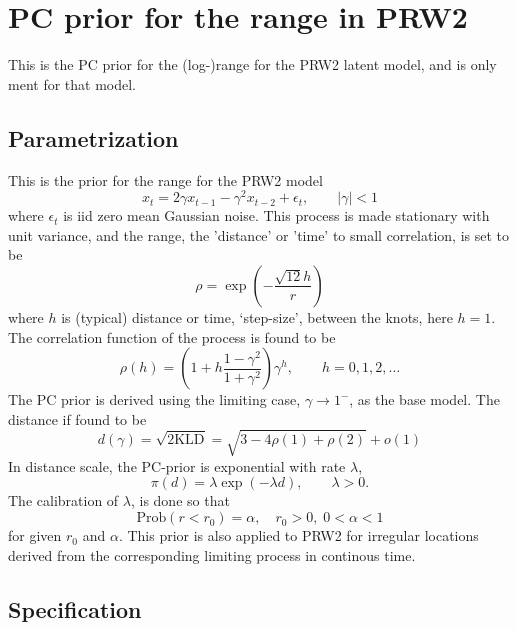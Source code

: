 \documentclass[a4paper,11pt]{article}
\begin{document}
\section*{PC prior for the range in PRW2}

This is the PC prior for the (log-)range for the PRW2 latent model,
and is only ment for that model.

\subsection*{Parametrization}

This is the prior for the range for the PRW2 model
\begin{displaymath}
    x_t = 2\gamma x_{t-1} - \gamma^{2} x_{t-2} + \epsilon_t, \qquad
    |\gamma| < 1
\end{displaymath}
where $\epsilon_t$ is iid zero mean Gaussian noise. This process is
made stationary with unit variance, and the range, the 'distance' or
'time' to small correlation, is set to be
\begin{displaymath}
    \rho = \exp\left( - \frac{\sqrt{12} h}{r} \right)
\end{displaymath}
where $h$ is (typical) distance or time, `step-size', between the
knots, here $h=1$. The correlation function of the process is found to
be
\begin{displaymath}
    \rho(h) = \left(1  + h \frac{1-\gamma^{2}}{1+\gamma^{2}}\right)\gamma^{h},
    \qquad h=0, 1, 2, \ldots
\end{displaymath}
The PC prior is derived using the limiting case,
$\gamma\rightarrow 1^{-}$, as the base model. The distance if found to
be
\begin{displaymath}
    d(\gamma) = \sqrt{2\text{KLD}} = \sqrt{3 - 4\rho(1) + \rho(2)} + o(1)
\end{displaymath}
In distance scale, the PC-prior is exponential with rate $\lambda$,
\begin{displaymath}
    \pi(d) = \lambda \exp(-\lambda d), \qquad \lambda > 0.
\end{displaymath}
The calibration of $\lambda$, is done so that
\begin{displaymath}
    \text{Prob}(r < r_0) = \alpha, \quad r_0 > 0, \; 0 < \alpha < 1
\end{displaymath}
for given $r_0$ and $\alpha$. This prior is also applied to PRW2 for
irregular locations derived from the corresponding limiting process in
continous time.

\subsection*{Specification}
\end{document}
